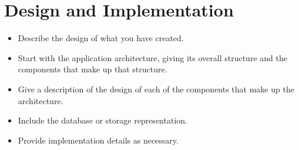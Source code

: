 \section{Design and Implementation}
\label{sec:imp}

\begin{itemize}
	\item Describe the design of what you have created.
	\item Start with the application architecture, giving its overall structure and the components that make up that structure.
	\item Give a description of the design of each of the components that make up the architecture.
	\item Include the database or storage representation.
	\item Provide implementation details as necessary.
\end{itemize}
